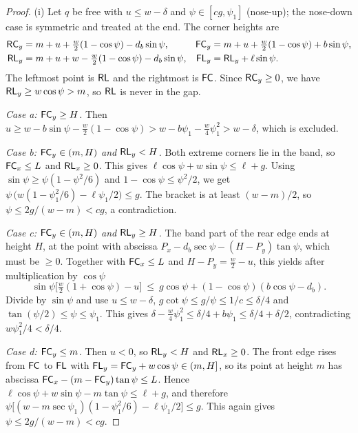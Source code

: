 \begin{proof}
(i) Let $q$ be free with $u\le w-\delta$ and $\psi\in[cg,\psi_1]$ (nose-up); the nose-down case is symmetric and treated at the end.
The corner heights are
\[
\begin{aligned}
  \mathsf{RC}_y&=m+u+\tfrac w2(1-\cos\psi)-d_b\sin\psi, & \mathsf{FC}_y&=m+u+\tfrac w2(1-\cos\psi)+b\sin\psi,\\
  \mathsf{RL}_y&=m+u+w-\tfrac w2(1-\cos\psi)-d_b\sin\psi, & \mathsf{FL}_y&=\mathsf{RL}_y+\ell\sin\psi .
\end{aligned}
\]
The leftmost point is $\mathsf{RL}$ and the rightmost is $\mathsf{FC}$.
Since $\mathsf{RC}_y\ge0$, we have $\mathsf{RL}_y\ge w\cos\psi>m$, so $\mathsf{RL}$ is never in the gap.

\emph{Case a: $\mathsf{FC}_y\ge H$.}
Then $u\ge w-b\sin\psi-\tfrac w2(1-\cos\psi)>w-b\psi_1-\tfrac w4\psi_1^2>w-\delta$, which is excluded.

\emph{Case b: $\mathsf{FC}_y\in(m,H)$ and $\mathsf{RL}_y<H$.}
Both extreme corners lie in the band, so $\mathsf{FC}_x\le L$ and $\mathsf{RL}_x\ge0$.
This gives $\ell\cos\psi+w\sin\psi\le\ell+g$.
Using $\sin\psi\ge\psi(1-\psi^2/6)$ and $1-\cos\psi\le\psi^2/2$, we get $\psi\,\big(w(1-\psi_1^2/6)-\ell\psi_1/2\big)\le g$.
The bracket is at least $(w-m)/2$, so $\psi\le 2g/(w-m)<cg$, a contradiction.

\emph{Case c: $\mathsf{FC}_y\in(m,H)$ and $\mathsf{RL}_y\ge H$.}
The band part of the rear edge ends at height $H$, at the point with abscissa $P_x-d_b\sec\psi-(H-P_y)\tan\psi$, which must be $\ge0$.
Together with $\mathsf{FC}_x\le L$ and $H-P_y=\tfrac w2-u$, this yields after multiplication by $\cos\psi$
\[
  \sin\psi\Big[\tfrac w2(1+\cos\psi)-u\Big]\ \le\ g\cos\psi+(1-\cos\psi)(b\cos\psi-d_b).
\]
Divide by $\sin\psi$ and use $u\le w-\delta$, $g\cot\psi\le g/\psi\le1/c\le\delta/4$ and $\tan(\psi/2)\le\psi\le\psi_1$.
This gives $\delta-\tfrac w4\psi_1^2\le\delta/4+b\psi_1\le\delta/4+\delta/2$, contradicting $w\psi_1^2/4<\delta/4$.

\emph{Case d: $\mathsf{FC}_y\le m$.}
Then $u<0$, so $\mathsf{RL}_y<H$ and $\mathsf{RL}_x\ge0$.
The front edge rises from $\mathsf{FC}$ to $\mathsf{FL}$ with $\mathsf{FL}_y=\mathsf{FC}_y+w\cos\psi\in(m,H]$, so its point at height $m$ has abscissa $\mathsf{FC}_x-(m-\mathsf{FC}_y)\tan\psi\le L$.
Hence $\ell\cos\psi+w\sin\psi-m\tan\psi\le\ell+g$, and therefore $\psi\big[(w-m\sec\psi_1)(1-\psi_1^2/6)-\ell\psi_1/2\big]\le g$.
This again gives $\psi\le2g/(w-m)<cg$.


\end{proof}
